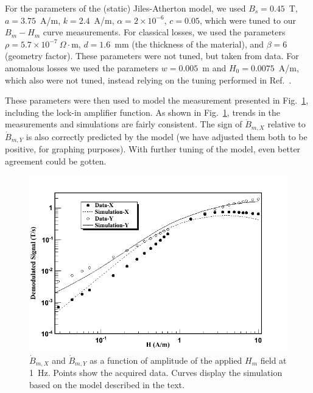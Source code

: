 For the parameters of the (static) Jiles-Atherton model, we used
$B_s=0.45$~T, $a=3.75$~A/m, $k=2.4$~A/m, $\alpha=2\times 10^{-6}$,
$c=0.05$, which were tuned to our $B_m-H_m$ curve measurements.  For
classical losses, we used the parameters $\rho=5.7\times
10^{-7}~\Omega\cdot$m, $d=1.6$~mm (the thickness of the material), and
$\beta=6$ (geometry factor).  These parameters were not tuned, but
taken from data.  For anomalous losses we used the parameters
$w=0.005$~m and $H_0=0.0075$~A/m, which also were not tuned, instead
relying on the tuning performed in Ref.~\cite{bib:jiles}.

These parameters were then used to model the measurement presented in
Fig.~\ref{fig:data_and_simulation}, including the lock-in amplifier
function.  As shown in Fig.~\ref{fig:data_and_simulation}, trends in
the measurements and simulations are fairly consistent.  The sign of
$\dot{B}_{m,X}$ relative to $\dot{B}_{m,Y}$ is also correctly
predicted by the model (we have adjusted them both to be positive, for
graphing purposes).  With further tuning of the model, even better
agreement could be gotten.

\begin{figure}[h!]
  \begin{center}
    \includegraphics[width=\textwidth]{data_and_simulation3.PNG}
    \caption{$\dot{B}_{m,X}$ and $\dot{B}_{m,Y}$ as a function of
      amplitude of the applied $H_m$ field at 1~Hz.  Points show the
      acquired data.  Curves display the simulation based on the model
      described in the text.}
    \label{fig:data_and_simulation}
  \end{center}
\end{figure} 

